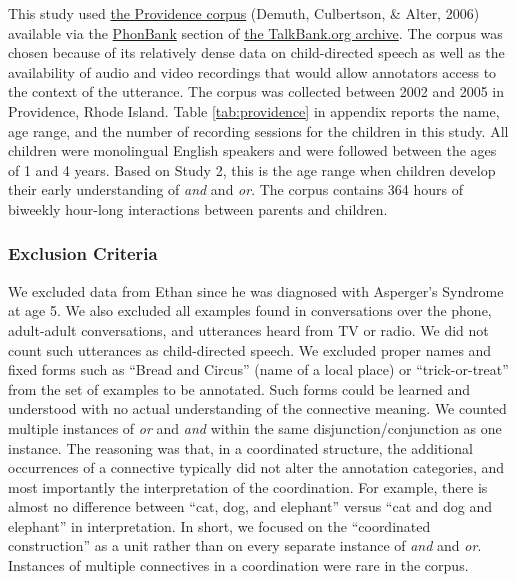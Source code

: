 \documentclass[,man,floatsintext]{apa6}
\begin{document}
This study used \href{https://phonbank.talkbank.org/browser/index.php?url=Eng-NA/Providence/}{the Providence corpus} (Demuth, Culbertson, \& Alter, 2006) available via the \href{https://phonbank.talkbank.org}{PhonBank} section of \href{https://talkbank.org/}{the TalkBank.org archive}. The corpus was chosen because of its relatively dense data on child-directed speech as well as the availability of audio and video recordings that would allow annotators access to the context of the utterance. The corpus was collected between 2002 and 2005 in Providence, Rhode Island. Table \ref{tab:providence} in appendix reports the name, age range, and the number of recording sessions for the children in this study. All children were monolingual English speakers and were followed between the ages of 1 and 4 years. Based on Study 2, this is the age range when children develop their early understanding of \emph{and} and \emph{or}. The corpus contains 364 hours of biweekly hour-long interactions between parents and children.

\hypertarget{exclusion-criteria-1}{%
\subsubsection{Exclusion Criteria}\label{exclusion-criteria-1}}

We excluded data from Ethan since he was diagnosed with Asperger's Syndrome at age 5. We also excluded all examples found in conversations over the phone, adult-adult conversations, and utterances heard from TV or radio. We did not count such utterances as child-directed speech. We excluded proper names and fixed forms such as \enquote{Bread and Circus} (name of a local place) or \enquote{trick-or-treat} from the set of examples to be annotated. Such forms could be learned and understood with no actual understanding of the connective meaning. We counted multiple instances of \emph{or} and \emph{and} within the same disjunction/conjunction as one instance. The reasoning was that, in a coordinated structure, the additional occurrences of a connective typically did not alter the annotation categories, and most importantly the interpretation of the coordination. For example, there is almost no difference between \enquote{cat, dog, and elephant} versus \enquote{cat and dog and elephant} in interpretation. In short, we focused on the \enquote{coordinated construction} as a unit rather than on every separate instance of \emph{and} and \emph{or}. Instances of multiple connectives in a coordination were rare in the corpus.
\end{document}
